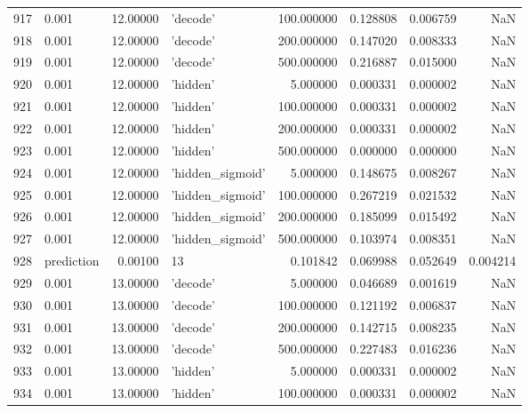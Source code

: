 \documentclass[10pt,a4paper]{article}
\begin{document}
\begin{tabular}{llrlrrrr}
917  &       0.001 &  12.00000 &           'decode' &  100.000000 &  0.128808 &  0.006759 &       NaN \\
918  &       0.001 &  12.00000 &           'decode' &  200.000000 &  0.147020 &  0.008333 &       NaN \\
919  &       0.001 &  12.00000 &           'decode' &  500.000000 &  0.216887 &  0.015000 &       NaN \\
920  &       0.001 &  12.00000 &           'hidden' &    5.000000 &  0.000331 &  0.000002 &       NaN \\
921  &       0.001 &  12.00000 &           'hidden' &  100.000000 &  0.000331 &  0.000002 &       NaN \\
922  &       0.001 &  12.00000 &           'hidden' &  200.000000 &  0.000331 &  0.000002 &       NaN \\
923  &       0.001 &  12.00000 &           'hidden' &  500.000000 &  0.000000 &  0.000000 &       NaN \\
924  &       0.001 &  12.00000 &   'hidden\_sigmoid' &    5.000000 &  0.148675 &  0.008267 &       NaN \\
925  &       0.001 &  12.00000 &   'hidden\_sigmoid' &  100.000000 &  0.267219 &  0.021532 &       NaN \\
926  &       0.001 &  12.00000 &   'hidden\_sigmoid' &  200.000000 &  0.185099 &  0.015492 &       NaN \\
927  &       0.001 &  12.00000 &   'hidden\_sigmoid' &  500.000000 &  0.103974 &  0.008351 &       NaN \\
928  &  prediction &   0.00100 &                 13 &    0.101842 &  0.069988 &  0.052649 &  0.004214 \\
929  &       0.001 &  13.00000 &           'decode' &    5.000000 &  0.046689 &  0.001619 &       NaN \\
930  &       0.001 &  13.00000 &           'decode' &  100.000000 &  0.121192 &  0.006837 &       NaN \\
931  &       0.001 &  13.00000 &           'decode' &  200.000000 &  0.142715 &  0.008235 &       NaN \\
932  &       0.001 &  13.00000 &           'decode' &  500.000000 &  0.227483 &  0.016236 &       NaN \\
933  &       0.001 &  13.00000 &           'hidden' &    5.000000 &  0.000331 &  0.000002 &       NaN \\
934  &       0.001 &  13.00000 &           'hidden' &  100.000000 &  0.000331 &  0.000002 &       NaN \\

\end{tabular}
\end{document}
